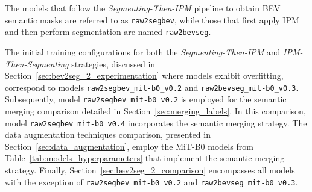 The models that follow the \textit{Segmenting-Then-IPM} pipeline to obtain BEV semantic masks are referred to as \texttt{raw2segbev}, while those that first apply IPM and then perform segmentation are named \texttt{raw2bevseg}.

The initial training configurations for both the \textit{Segmenting-Then-IPM} and \textit{IPM-Then-Segmenting} strategies, discussed in Section~\ref{sec:bev2seg_2_experimentation} where models exhibit overfitting, correspond to models \texttt{raw2segbev\_mit-b0\_v0.2} and \texttt{raw2bevseg\_mit-b0\_v0.3}. Subsequently, model \texttt{raw2segbev\_mit-b0\_v0.2} is employed for the semantic merging comparison detailed in Section~\ref{sec:merging_labels}. In this comparison, model \texttt{raw2segbev\_mit-b0\_v0.4} incorporates the semantic merging strategy. The data augmentation techniques comparison, presented in Section~\ref{sec:data_augmentation}, employ the MiT-B0 models from Table~\ref{tab:models_hyperparameters} that implement the semantic merging strategy. Finally, Section~\ref{sec:bev2seg_2_comparison} encompasses all models with the exception of \texttt{raw2segbev\_mit-b0\_v0.2} and \texttt{raw2bevseg\_mit-b0\_v0.3}.

